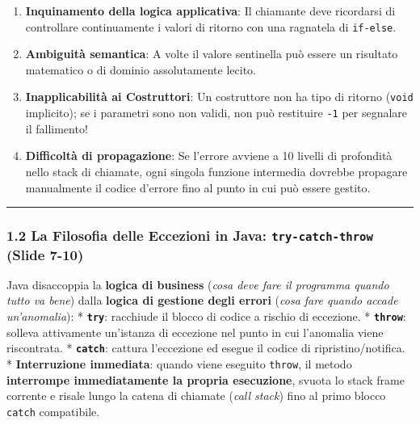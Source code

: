 \documentclass[11pt,a4paper]{article}
\newcommand{\passthrough}[1]{#1}
\providecommand{\tightlist}{\setlength{\itemsep}{0pt}\setlength{\parskip}{0pt}}
\begin{document}
\begin{enumerate}
\def\labelenumi{\arabic{enumi}.}
\tightlist
\item
  \textbf{Inquinamento della logica applicativa}: Il chiamante deve
  ricordarsi di controllare continuamente i valori di ritorno con una
  ragnatela di \passthrough{\lstinline!if-else!}.
\item
  \textbf{Ambiguità semantica}: A volte il valore sentinella può essere
  un risultato matematico o di dominio assolutamente lecito.
\item
  \textbf{Inapplicabilità ai Costruttori}: Un costruttore non ha tipo di
  ritorno (\passthrough{\lstinline!void!} implicito); se i parametri
  sono non validi, non può restituire \passthrough{\lstinline!-1!} per
  segnalare il fallimento!
\item
  \textbf{Difficoltà di propagazione}: Se l'errore avviene a 10 livelli
  di profondità nello stack di chiamate, ogni singola funzione
  intermedia dovrebbe propagare manualmente il codice d'errore fino al
  punto in cui può essere gestito.
\end{enumerate}

\begin{center}\rule{0.5\linewidth}{0.5pt}\end{center}

\subsubsection{\texorpdfstring{1.2 La Filosofia delle Eccezioni in Java:
\texttt{try-catch-throw} (Slide
7-10)}{1.2 La Filosofia delle Eccezioni in Java: try-catch-throw (Slide 7-10)}}\label{la-filosofia-delle-eccezioni-in-java-try-catch-throw-slide-7-10}

Java disaccoppia la \textbf{logica di business} (\emph{cosa deve fare il
programma quando tutto va bene}) dalla \textbf{logica di gestione degli
errori} (\emph{cosa fare quando accade un'anomalia}): *
\textbf{\passthrough{\lstinline!try!}}: racchiude il blocco di codice a
rischio di eccezione. * \textbf{\passthrough{\lstinline!throw!}}:
solleva attivamente un'istanza di eccezione nel punto in cui l'anomalia
viene riscontrata. * \textbf{\passthrough{\lstinline!catch!}}: cattura
l'eccezione ed esegue il codice di ripristino/notifica. *
\textbf{Interruzione immediata}: quando viene eseguito
\passthrough{\lstinline!throw!}, il metodo \textbf{interrompe
immediatamente la propria esecuzione}, svuota lo stack frame corrente e
risale lungo la catena di chiamate (\emph{call stack}) fino al primo
blocco \passthrough{\lstinline!catch!} compatibile.
\end{document}
